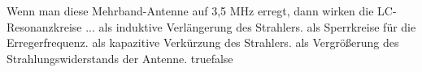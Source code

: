     {Wenn man diese Mehrband-Antenne auf 3,5 MHz erregt, dann wirken die LC-Resonanzkreise ...}
    {als induktive Verlängerung des Strahlers.}
    {als Sperrkreise für die Erregerfrequenz.}
    {als kapazitive Verkürzung des Strahlers.}
    {als Vergrößerung des Strahlungswiderstands der Antenne.}
    {true}{false}